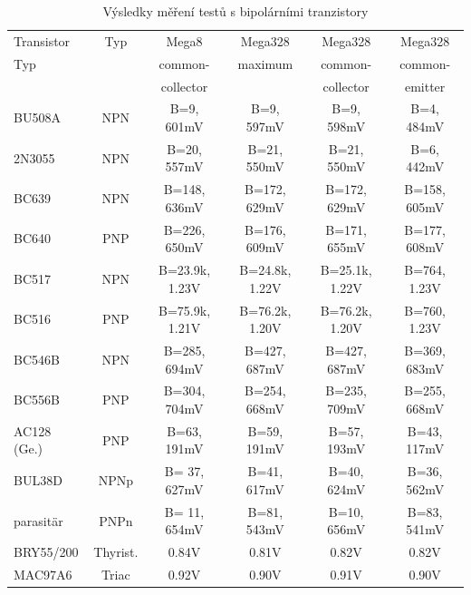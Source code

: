 \begin{table}[H]
  \begin{center}
    \begin{tabular}{| l | c | c | c | c | c |}
    \hline
 Transistor & Typ & Mega8           & Mega328        & Mega328         & Mega328 \\
    Typ     &     & common-         & maximum        & common-         & common- \\
            &     & collector       &                & collector       & emitter \\
    \hline
    \hline
BU508A      & NPN & B=9, 601mV      &  B=9, 597mV    &   B=9, 598mV    & B=4, 484mV \\
    \hline
2N3055      & NPN & B=20, 557mV     &  B=21, 550mV   &   B=21, 550mV   & B=6, 442mV \\
    \hline
BC639       & NPN & B=148, 636mV    &  B=172, 629mV  &   B=172, 629mV  & B=158, 605mV \\
    \hline
BC640       & PNP & B=226, 650mV    &  B=176, 609mV  &   B=171, 655mV  & B=177, 608mV \\
    \hline
BC517       & NPN & B=23.9k, 1.23V  &  B=24.8k, 1.22V&   B=25.1k, 1.22V & B=764, 1.23V \\
    \hline
BC516       & PNP & B=75.9k, 1.21V  &  B=76.2k, 1.20V&   B=76.2k, 1.20V & B=760, 1.23V \\
    \hline
BC546B      & NPN & B=285, 694mV    &  B=427, 687mV  &   B=427, 687mV   & B=369, 683mV \\
    \hline
BC556B      & PNP & B=304, 704mV    &  B=254, 668mV  &   B=235, 709mV   & B=255, 668mV \\
    \hline
AC128 (Ge.) & PNP & B=63, 191mV     &  B=59, 191mV   &   B=57, 193mV    & B=43, 117mV \\
    \hline
BUL38D      & NPNp & B= 37, 627mV    &  B=41, 617mV  &   B=40, 624mV    & B=36, 562mV \\
parasitär   & PNPn & B= 11, 654mV    &  B=81, 543mV  &   B=10, 656mV    & B=83, 541mV \\
    \hline
BRY55/200   & Thyrist. &  0.84V      &  0.81V        &  0.82V           &  0.82V \\
    \hline
MAC97A6     & Triac &   0.92V        &  0.90V        &  0.91V           &  0.90V    \\
    \hline
    \end{tabular}
  \end{center}
  \caption{Výsledky měření testů s bipolárními tranzistory}
  \label{tab:bipolar} 
\end{table}

